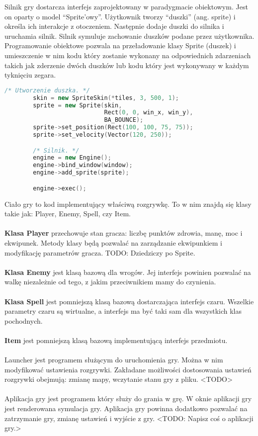 \documentclass[12pt, titlepage]{article}
\begin{document}
\noindent
Silnik gry dostarcza interfejs zaprojektowany w
paradygmacie obiektowym. Jest on oparty o model
"`Sprite'owy"'. Użytkownik tworzy "`duszki"' (ang.
sprite) i określa ich interakcje z otoczeniem.
Następnie dodaje duszki do silnika i uruchamia
silnik. Silnik symuluje zachowanie duszków
podane przez użytkownika. Programowanie obiektowe
pozwala na przeładowanie klasy Sprite (duszek) i
umieszczenie w nim kodu który zostanie wykonany na
odpowiednich zdarzeniach takich jak zderzenie dwóch
duszków lub kodu który jest wykonywany w każdym
tyknięciu zegara.

\begin{lstlisting}[language=C++, caption=Interfejs silnika - kod poglądowy]
        /* Utworzenie duszka. */
        skin = new SpriteSkin(*tiles, 3, 500, 1);
        sprite = new Sprite(skin,
                            Rect(0, 0, win_x, win_y),
                            BA_BOUNCE);
        sprite->set_position(Rect(100, 100, 75, 75));
        sprite->set_velocity(Vector(120, 250));

        /* Silnik. */
        engine = new Engine();
        engine->bind_window(window);
        engine->add_sprite(sprite);

        engine->exec();
\end{lstlisting}

\noindent
Ciało gry to kod implementujący właściwą
rozgrywkę. To w nim znajdą się klasy takie
jak: Player, Enemy, Spell, czy Item.
\\~\\
\textbf{Klasa Player} przechowuje
stan gracza: liczbę punktów zdrowia, manę,
moc i ekwipunek. Metody klasy
będą pozwalać na zarządzanie ekwipunkiem i
modyfikację parametrów gracza.
TODO: Dziedziczy po Sprite.
\\~\\
\textbf{Klasa Enemy} jest klasą bazową
dla wrogów. Jej interfejs powinien
pozwalać na walkę niezależnie od tego,
z jakim przeciwnikiem mamy do czynienia.
\\~\\
\textbf{Klasa Spell} jest pomniejszą
klasą
bazową dostarczająca interfejs czaru.
Wszelkie parametry czaru są wirtualne,
a interfejs ma być taki sam dla wszystkich
klas pochodnych.
\\~\\
\textbf{Item} jest pomniejszą klasą
bazową implementującą interfejs
przedmiotu.
\\~\\
Launcher jest programem służącym do uruchomienia gry.
Można w nim modyfikować ustawienia rozgrywki. Zakładane
możliwości dostosowania ustawień rozgrywki obejmują:
zmianę mapy, wczytanie stanu gry z pliku. <TODO>
\\~\\
Aplikacja gry jest programem który służy
do grania w grę. W oknie aplikacji gry jest
renderowana symulacja gry. Aplikacja gry
powinna dodatkowo pozwalać na zatrzymanie
gry, zmianę ustawień i wyjście z gry. <TODO:
Napisz coś o aplikacji gry.>
\end{document}
